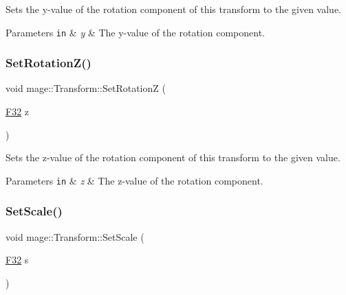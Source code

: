 Sets the y-\/value of the rotation component of this transform to the given value.


\begin{DoxyParams}[1]{Parameters}
\mbox{\tt in}  & {\em y} & The y-\/value of the rotation component. \\
\hline
\end{DoxyParams}
\hypertarget{structmage_1_1_transform_aca5e1d7c83e91f9c36be98c4a4a2163b}{}\label{structmage_1_1_transform_aca5e1d7c83e91f9c36be98c4a4a2163b} 
\subsubsection{\texorpdfstring{Set\+Rotation\+Z()}{SetRotationZ()}}
{\footnotesize\ttfamily void mage\+::\+Transform\+::\+Set\+RotationZ (\begin{DoxyParamCaption}\item[{\hyperlink{namespacemage_aa97e833b45f06d60a0a9c4fc22ae02c0}{F32}}]{z }\end{DoxyParamCaption})\hspace{0.3cm}{\ttfamily [noexcept]}}

Sets the z-\/value of the rotation component of this transform to the given value.


\begin{DoxyParams}[1]{Parameters}
\mbox{\tt in}  & {\em z} & The z-\/value of the rotation component. \\
\hline
\end{DoxyParams}
\hypertarget{structmage_1_1_transform_acf366489ae37e771e3f7b06c6452cb33}{}\label{structmage_1_1_transform_acf366489ae37e771e3f7b06c6452cb33} 
\subsubsection{\texorpdfstring{Set\+Scale()}{SetScale()}\hspace{0.1cm}{\footnotesize\ttfamily [1/5]}}
{\footnotesize\ttfamily void mage\+::\+Transform\+::\+Set\+Scale (\begin{DoxyParamCaption}\item[{\hyperlink{namespacemage_aa97e833b45f06d60a0a9c4fc22ae02c0}{F32}}]{s }\end{DoxyParamCaption})\hspace{0.3cm}{\ttfamily [noexcept]}}

